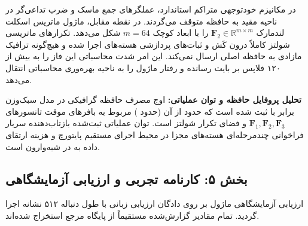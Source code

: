 در مکانیزم خودتوجهی متراکم استاندارد، عملگرهای جمع ماسک و ضرب تداعی‌گر در ناحیه مقید به حافظه  متوقف می‌گردند. در نقطه مقابل، ماژول  ماتریس اسکلت لندمارک $\mathbf{F}_2 \in \mathbb{R}^{m \times m}$ را با ابعاد کوچک $m=64$ شکل می‌دهد. تکرارهای ماتریسی شولتز کاملاً درون کَش  و ثبات‌های پردازشی هسته‌های  اجرا شده و هیچ‌گونه ترافیک مازادی به حافظه اصلی  ارسال نمی‌کند. این امر شدت محاسباتی این فاز را به بیش از ۱۲۰ فلاپس بر بایت رسانده و رفتار ماژول را به ناحیه بهره‌وری محاسباتی  انتقال می‌دهد.

\textbf{تحلیل پروفایل حافظه و توان عملیاتی:}
اوج مصرف حافظه گرافیکی در مدل سبک‌وزن  برابر با  ثبت شده است که حدود  از آن (حدود ) مربوط به بافرهای موقت تانسورهای $\mathbf{F}_1, \mathbf{F}_2, \mathbf{F}_3$ و فضای تکرار شولتز است. توان عملیاتی ثبت‌شده  بازتاب‌دهنده سربار فراخوانی چندمرحله‌ای هسته‌های مجزا در محیط اجرای مستقیم  پایتورچ و هزینه ارتقای داده به  در شبه‌وارون است.

\subsection*{بخش ۵: کارنامه تجربی و ارزیابی آزمایشگاهی }
ارزیابی آزمایشگاهی ماژول بر روی دادگان ارزیابی زبانی  با طول دنباله ۵۱۲ نشانه اجرا گردید. تمام مقادیر گزارش‌شده مستقیماً از پایگاه مرجع  استخراج شده‌اند.

